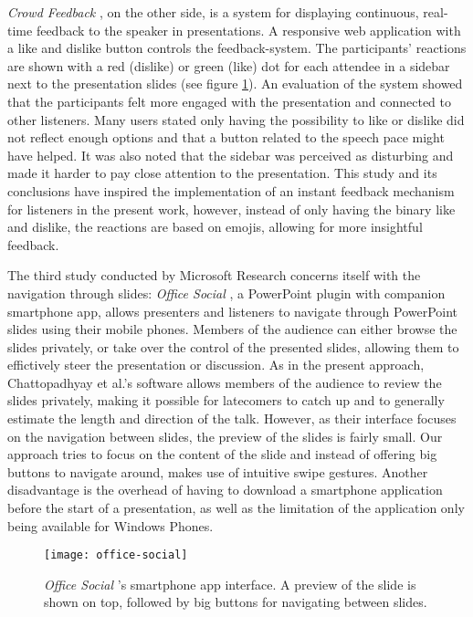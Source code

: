 \emph{Crowd Feedback} \cite{Teevan:MobileFeedbackDuringPresentation}, on the other side, is a system for displaying continuous, real-time feedback to the speaker in presentations. A responsive web application with a like and dislike button controls the feedback-system. The participants' reactions are shown with a red (dislike) or green (like) dot for each attendee in a sidebar next to the presentation slides (see figure \ref{fig:related-work-crowd-feedback}). An evaluation of the system showed that the participants felt more engaged with the presentation and connected to other listeners. Many users stated only having the possibility to like or dislike did not reflect enough options and that a button related to the speech pace might have helped. It was also noted that the sidebar was perceived as disturbing and made it harder to pay close attention to the presentation. This study and its conclusions have inspired the implementation of an instant feedback mechanism for listeners in the present work, however, instead of only having the binary like and dislike, the reactions are based on emojis, allowing for more insightful feedback.

The third study conducted by Microsoft Research concerns itself with the navigation through slides: \emph{Office Social} \cite{Chattopadhyay:OfficeSocialRemoteControl}, a PowerPoint plugin with companion smartphone app, allows presenters and listeners to navigate through PowerPoint slides using their mobile phones. Members of the audience can either browse the slides privately, or take over the control of the presented slides, allowing them to effictively steer the presentation or discussion. As in the present approach, Chattopadhyay et al.'s software allows members of the audience to review the slides privately, making it possible for latecomers to catch up and to generally estimate the length and direction of the talk. However, as their interface focuses on the navigation between slides, the preview of the slides is fairly small. Our approach tries to focus on the content of the slide and instead of offering big buttons to navigate around, makes use of intuitive swipe gestures. Another disadvantage is the overhead of having to download a smartphone application before the start of a presentation, as well as the limitation of the application only being available for Windows Phones.

\begin{figure}
\centering
\texttt{[image: office-social]}
\caption{\emph{Office Social} \cite{Chattopadhyay:OfficeSocialRemoteControl}'s smartphone app interface. A preview of the slide is shown on top, followed by big buttons for navigating between slides.}
\label{fig:related-work-crowd-feedback}
\end{figure}


